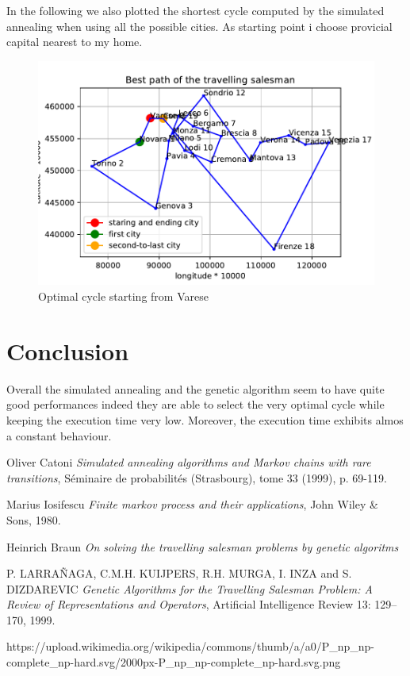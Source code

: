\documentclass{article}
\begin{document}
In the following we also plotted the shortest cycle computed by the simulated annealing when using all the possible cities. As starting point i choose provicial capital nearest to my home.
\begin{figure}[H]
\includegraphics[scale=1]{../path.pdf} 
\centering
\caption{Optimal cycle starting from Varese}
\end{figure}

\section{Conclusion}
Overall the simulated annealing and the genetic algorithm seem to have quite good performances indeed they are able to select the very optimal cycle while keeping the execution time very low. Moreover, the execution time exhibits almos a constant behaviour.

\begin{thebibliography}{9}

Oliver Catoni
\textit{Simulated annealing algorithms and Markov chains with rare transitions}, Séminaire de probabilités (Strasbourg), tome 33 (1999), p. 69-119.

Marius Iosifescu
\textit{Finite markov process and their applications}, John Wiley \& Sons, 1980.

Heinrich Braun
\textit{On solving the travelling salesman problems by genetic algoritms}

P. LARRAÑAGA, C.M.H. KUIJPERS, R.H. MURGA, I. INZA and S. DIZDAREVIC
\textit{Genetic Algorithms for the Travelling Salesman Problem: A Review of Representations and Operators}, Artificial Intelligence Review 13: 129–170, 1999.

https://upload.wikimedia.org/wikipedia/commons/thumb/a/a0/P\_np\_np-complete\_np-hard.svg/2000px-P\_np\_np-complete\_np-hard.svg.png

 
\end{thebibliography}
\end{document}

